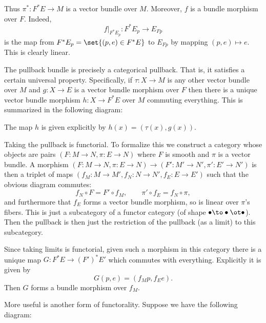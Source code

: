Thus $\pi^*\colon F^*E\to M$ is a vector bundle over $M$.
Moreover, $f$ is a bundle morphism over $F$.
Indeed,
$$ f|_{F^*E_p}\colon F^*E_p \to E_{Fp} $$
is the map from $F^*E_p=\set{(p,e)\in F^*E}$ to $E_{Fp}$ by mapping $(p,e)\mapsto e$.
This is clearly linear.

The pullback bundle is precisely a categorical pullback.
That is, it satisfies a certain universal property.
Specifically, if $\tau\colon X\to M$ is any other vector bundle over $M$ and $g\colon X\to E$ is a vector bundle morphism over $F$
then there is a unique vector bundle morphism $h\colon X\to F^*E$ over $M$ commuting everything.
This is summarized in the following diagram:

\bigskip
\centerline{}

The map $h$ is given explicitly by $h(x) = (\tau(x),g(x))$.

Taking the pullback is functorial.
To formalize this we construct a category whose objects are pairs $(F\colon M\to N,\pi\colon E\to N)$ where $F$ is smooth and $\pi$ is a
vector bundle.
A morphism $(F\colon M\to N,\pi\colon E\to N)\to(F'\colon M'\to N',\pi'\colon E'\to N')$ is then a triplet of maps
$(f_M\colon M\to M',f_N\colon N\to N',f_E\colon E\to E')$ such that the obvious diagram commutes:
$$ f_N\circ F = F'\circ f_M,\qquad \pi'\circ f_E = f_N\circ\pi , $$
and furthermore that $f_E$ forms a vector bundle morphism, so is linear over $\pi$'s fibers.
This is just a subcategory of a functor category (of shape $\bul\to\bul\ot\bul$).
Then the pullback is then just the restriction of the pullback (as a limit) to this subcategory.

Since taking limits is functorial, given such a morphism in this category there is a unique map $G\colon F^*E\to(F')^*E'$ which commutes
with everything.
Explicitly it is given by
$$ G(p,e) = (f_Mp,f_Ee) . $$
Then $G$ forms a bundle morphism over $f_M$.

More useful is another form of functorality.
Suppose we have the following diagram:


